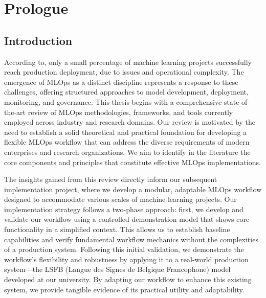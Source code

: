 \chapter{Prologue} %

\section{Introduction}


According to\cite{10.1145/3533378}, only a small percentage of machine learning projects successfully reach production deployment, due to issues and operational complexity\cite{Haakman2021}.
The emergence of MLOps as a distinct discipline represents a response to these challenges, offering structured approaches to model development, deployment, monitoring, and governance\cite{treveil2020introducing}.
This thesis begins with a comprehensive state-of-the-art review of MLOps methodologies, frameworks, and tools currently employed across industry and research domains.
Our review is motivated by the need to establish a solid theoretical and practical foundation for developing a flexible MLOps workflow that can address the diverse requirements of modern enterprises and research organizations.
We aim to identify in the literature the core components and principles that constitute effective MLOps implementations\cite{DBLP:journals/corr/abs-2103-08942}.

The insights gained from this review directly inform our subsequent implementation project, where we develop a modular, adaptable MLOps workflow designed to accommodate various scales of machine learning projects.
Our implementation strategy follows a two-phase approach: first, we develop and validate our workflow using a controlled demonstration model that shows core functionality in a simplified context.
This allows us to establish baseline capabilities and verify fundamental workflow mechanics without the complexities of a production system.
Following this initial validation, we demonstrate the workflow's flexibility and robustness by applying it to a real-world production system—the LSFB (Langue des Signes de Belgique Francophone) model developed at our university\cite{9534336}.
By adapting our workflow to enhance this existing system, we provide tangible evidence of its practical utility and adaptability.


